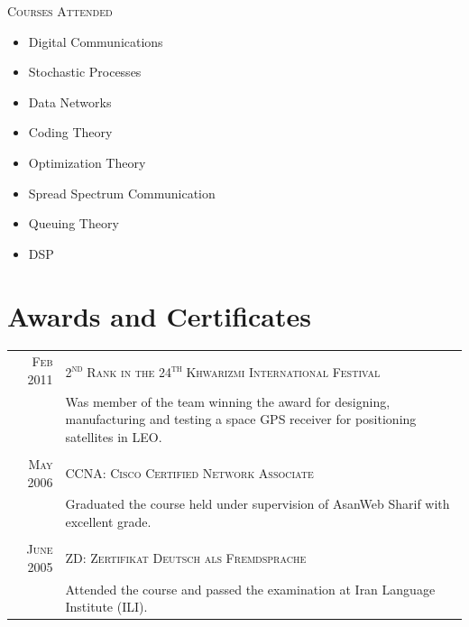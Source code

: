 \documentclass[a4paper,10pt]{article}
\begin{document}
\textsc{Courses Attended}
\begin{itemize}[topsep=-3pt, itemsep=-3pt]
\item Digital Communications
\item Stochastic Processes
\item Data Networks
\item Coding Theory
\item Optimization Theory
\item Spread Spectrum Communication
\item Queuing Theory
\item DSP
\end{itemize}

\section{Awards and Certificates}
\begin{tabular}{r|p{11cm}}%
\textsc{Feb} 2011 & \textsc{2\textsuperscript{nd} Rank in the 24\textsuperscript{th} Khwarizmi International Festival}\\
& \footnotesize{Was member of the team winning the award for designing, manufacturing and testing a space GPS receiver for positioning satellites in LEO.}\\\multicolumn{2}{c}{}\\
\textsc{May} 2006 & \textsc{CCNA: Cisco Certified Network Associate}\\
& \footnotesize{Graduated the course held under supervision of AsanWeb Sharif with excellent grade.}\\\multicolumn{2}{c}{}\\
\textsc{June} 2005 & \textsc{ZD: Zertifikat Deutsch als Fremdsprache}\\
& \footnotesize{Attended the course and passed the examination at Iran Language Institute (ILI)}.
\end{tabular}

\end{document}

